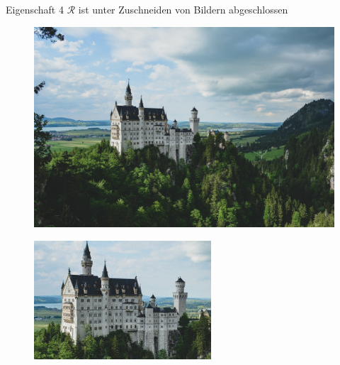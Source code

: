 \documentclass[10pt]{beamer}
\begin{document}
\begin{frame}{Eigenschaft 4}
  \( \mathcal{R} \) ist unter Zuschneiden von Bildern abgeschlossen

  \begin{minipage}{.45\textwidth}
    \begin{figure}
      \includegraphics[width=\textwidth]{neuschwanstein}
    \end{figure}
  \end{minipage}
  \hfill
  \begin{minipage}{.45\textwidth}
    \begin{figure}
      \includegraphics[width=\textwidth]{neuschwanstein-cropped}
    \end{figure}
  \end{minipage}
\end{frame}
\end{document}
